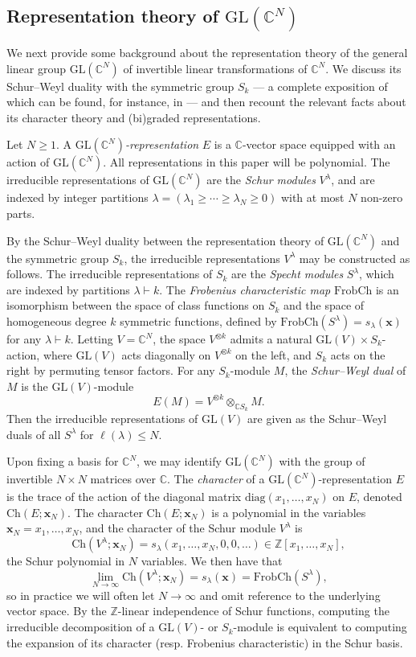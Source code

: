 \documentclass[11pt]{article}
\theoremstyle{definition}
\numberwithin{equation}{section}
\newcommand\CC{\mathbb{C}}
\newcommand\ZZ{\mathbb{Z}}
\newcommand\GL{\mathrm{GL}}
\newcommand\xb{\mathbf{x}}
\newcommand\Ch{\mathrm{Ch}}
\newcommand\FrobCh{\mathrm{FrobCh}}
\begin{document}
\subsection{Representation theory of \texorpdfstring{$\GL(\CC^N)$}{GL(C\^{}N)}}
We next provide some background about the representation theory of the general linear group $\GL(\CC^N)$ of invertible linear transformations of $\CC^N$. We discuss its Schur--Weyl duality with the symmetric group $S_k$ --- a complete exposition of which can be found, for instance, in \cite{Ful} --- and then recount the relevant facts about its character theory and (bi)graded representations.

Let $N \ge 1$. A \emph{$\GL(\CC^N)$-representation} $E$ is a $\CC$-vector space equipped with an action of $\GL(\CC^N)$. All representations in this paper will be polynomial. The irreducible representations of $\GL(\CC^N)$ are the \emph{Schur modules} $V^\lambda$, and are indexed by integer partitions $\lambda = (\lambda_1 \ge \cdots \ge \lambda_N \ge 0)$ with at most $N$ non-zero parts. 

By the Schur--Weyl duality between the representation theory of $\GL(\CC^N)$ and the symmetric group $S_k$, the irreducible representations $V^\lambda$ may be constructed as follows. The irreducible representations of $S_k$ are the \emph{Specht modules} $S^\lambda$, which are indexed by partitions $\lambda \vdash k$. The \emph{Frobenius characteristic map} $\FrobCh$ is an isomorphism between the space of class functions on $S_k$ and the space of homogeneous degree $k$ symmetric functions, defined by $\FrobCh(S^\lambda) = s_\lambda(\xb)$ for any $\lambda \vdash k$. Letting $V = \CC^N$, the space $V^{\otimes k}$ admits a natural $\GL(V) \times S_k$-action, where $\GL(V)$ acts diagonally on $V^{\otimes k}$ on the left, and $S_k$ acts on the right by permuting tensor factors. For any $S_k$-module $M$, the \emph{Schur--Weyl dual} of $M$ is the $\GL(V)$-module
\[
E(M) = V^{\otimes k} \otimes_{\CC S_k} M.
\]
Then the irreducible representations of $\GL(V)$ are given as the Schur--Weyl duals of all $S^\lambda$ for $\ell(\lambda) \le N$.

Upon fixing a basis for $\CC^N$, we may identify $\GL(\CC^N)$ with the group of invertible $N \times N$ matrices over $\CC$. The \emph{character} of a $\GL(\CC^N)$-representation $E$ is the trace of the action of the diagonal matrix $\mathrm{diag}(x_1,\ldots,x_N)$ on $E$, denoted $\Ch(E;\xb_N)$. The character $\Ch(E;\xb_N)$ is a polynomial in the variables $\xb_N = x_1,\ldots,x_N$, and the character of the Schur module $V^\lambda$ is
\[
\Ch(V^\lambda;\xb_N) = s_\lambda(x_1,\ldots,x_N,0,0,\ldots) \in \ZZ[x_1,\ldots,x_N],
\]
the Schur polynomial in $N$ variables. We then have that
\[
\lim_{N \to \infty} \Ch(V^\lambda;\xb_N) = s_\lambda(\xb) = \FrobCh(S^\lambda),
\]
so in practice we will often let $N \to \infty$ and omit reference to the underlying vector space. By the $\ZZ$-linear independence of Schur functions, computing the irreducible decomposition of a $\GL(V)$- or $S_k$-module is equivalent to computing the expansion of its character (resp. Frobenius characteristic) in the Schur basis.
\end{document}
